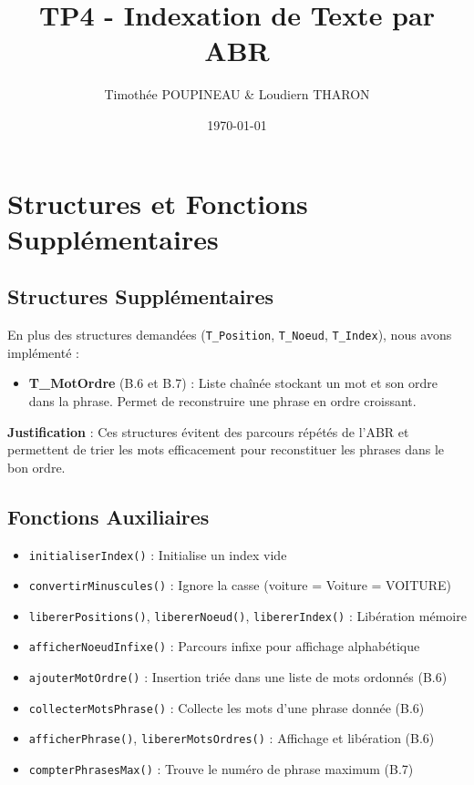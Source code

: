 \documentclass[12pt,a4paper]{article}
\title{\textbf{TP4 - Indexation de Texte par ABR}}
\author{Timothée POUPINEAU \& Loudiern THARON}
\date{\today}
\begin{document}
\maketitle

\section{Structures et Fonctions Supplémentaires}

\subsection{Structures Supplémentaires}

En plus des structures demandées (\texttt{T\_Position}, \texttt{T\_Noeud}, \texttt{T\_Index}), nous avons implémenté :

\begin{itemize}[noitemsep,topsep=0pt]
    \item \textbf{T\_MotOrdre} (B.6 et B.7) : Liste chaînée stockant un mot et son ordre dans la phrase. Permet de reconstruire une phrase en ordre croissant.
\end{itemize}

\textbf{Justification} : Ces structures évitent des parcours répétés de l'ABR et permettent de trier les mots efficacement pour reconstituer les phrases dans le bon ordre.

\subsection{Fonctions Auxiliaires}

\begin{itemize}[noitemsep,topsep=0pt]
    \item \texttt{initialiserIndex()} : Initialise un index vide
    \item \texttt{convertirMinuscules()} : Ignore la casse (voiture = Voiture = VOITURE)
    \item \texttt{libererPositions()}, \texttt{libererNoeud()}, \texttt{libererIndex()} : Libération mémoire
    \item \texttt{afficherNoeudInfixe()} : Parcours infixe pour affichage alphabétique
    \item \texttt{ajouterMotOrdre()} : Insertion triée dans une liste de mots ordonnés (B.6)
    \item \texttt{collecterMotsPhrase()} : Collecte les mots d'une phrase donnée (B.6)
    \item \texttt{afficherPhrase()}, \texttt{libererMotsOrdres()} : Affichage et libération (B.6)
    \item \texttt{compterPhrasesMax()} : Trouve le numéro de phrase maximum (B.7)
\end{itemize}
\end{document}
